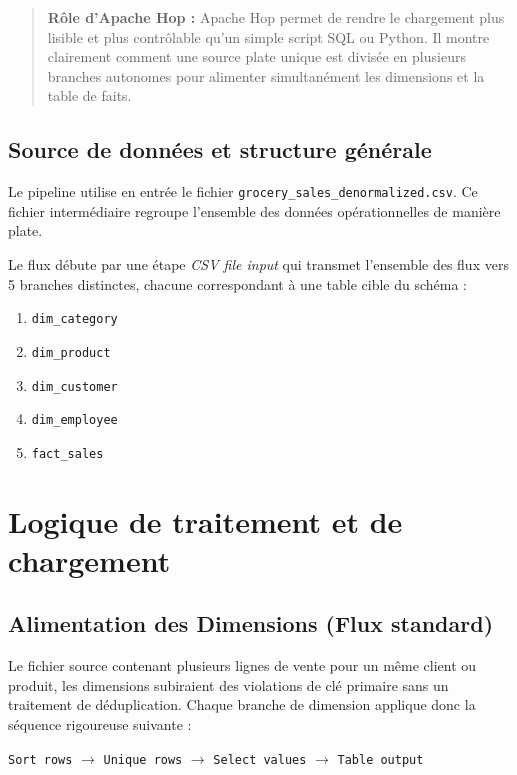 \documentclass[12pt,a4paper,twoside]{report}
\begin{document}
\begin{quotation}
\noindent\textbf{Rôle d'Apache Hop :}\newline
Apache Hop permet de rendre le chargement plus lisible et plus contrôlable qu'un simple script SQL ou Python. Il montre clairement comment une source plate unique est divisée en plusieurs branches autonomes pour alimenter simultanément les dimensions et la table de faits.
\end{quotation}

\subsection{Source de données et structure générale}
Le pipeline utilise en entrée le fichier \texttt{grocery\_sales\_denormalized.csv}. Ce fichier intermédiaire regroupe l'ensemble des données opérationnelles de manière plate. 

Le flux débute par une étape \textit{CSV file input} qui transmet l'ensemble des flux vers 5 branches distinctes, chacune correspondant à une table cible du schéma :
\begin{enumerate}
    \item \texttt{dim\_category}
    \item \texttt{dim\_product}
    \item \texttt{dim\_customer}
    \item \texttt{dim\_employee}
    \item \texttt{fact\_sales}
\end{enumerate}

\section{Logique de traitement et de chargement}

\subsection{Alimentation des Dimensions (Flux standard)}
Le fichier source contenant plusieurs lignes de vente pour un même client ou produit, les dimensions subiraient des violations de clé primaire sans un traitement de déduplication. Chaque branche de dimension applique donc la séquence rigoureuse suivante :

\begin{center}
\texttt{Sort rows} $\longrightarrow$ \texttt{Unique rows} $\longrightarrow$ \texttt{Select values} $\longrightarrow$ \texttt{Table output}
\end{center}
\end{document}
